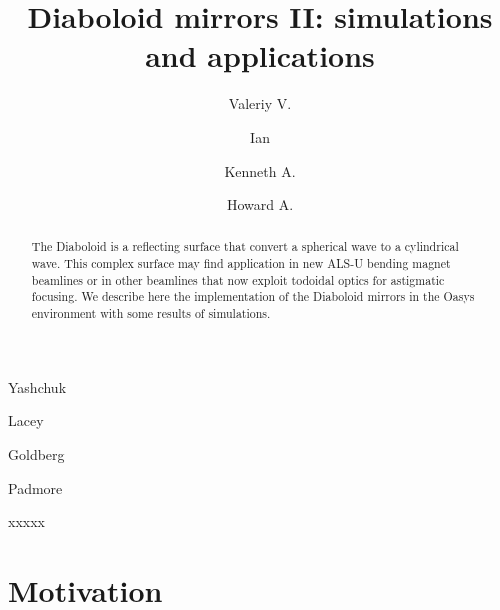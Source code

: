 \documentclass{iucr}              %
\begin{document}




\title{Diaboloid mirrors II: simulations and applications}

\author[b]{Valeriy V.}{Yashchuk}
\author[b]{Ian}{Lacey}
\author[b]{Kenneth A.}{Goldberg}
\author[b]{Howard A.}{Padmore}



\begin{synopsis}
xxxxx
\end{synopsis}

\begin{abstract}
The Diaboloid is a reflecting surface that convert a spherical wave to a cylindrical wave. This complex surface may find application in new ALS-U bending magnet beamlines or in other  beamlines that now exploit todoidal optics for astigmatic focusing. We describe here the implementation of the Diaboloid mirrors in the Oasys environment with some results of  simulations. 
\end{abstract}

\section{Motivation}

\end{document}
